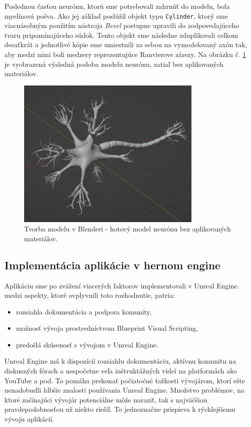 Poslednou časťou neurónu, ktorú sme potrebovali zahrnúť do modelu, bola myelínová pošva. Ako jej základ poslúžil objekt typu \texttt{Cylinder}, ktorý sme viacnásobným použitím nástroja \emph{Bevel} postupne
upravili do zodpovedajúceho tvaru pripomínajúceho súdok. Tento objekt sme následne zduplikovali celkom desaťkrát a jednotlivé kópie sme umiestnili za sebou na vymodelovaný axón tak, aby medzi 
nimi boli medzery reprezentujúce Ranvierove zárezy. Na obrázku č. \ref{blender5} je vyobrazená výsledná podoba modelu neurónu, zatiaľ bez aplikovaných materiálov.
 
\begin{figure}[!htbp]
  \centering
  \includegraphics[width=9cm]{img/finalModel-crop.png}
  \caption{Tvorba modelu v Blenderi - hotový model neurónu bez aplikovaných materiálov.}
  \label{blender5}
\end{figure}

\subsection{Implementácia aplikácie v hernom engine}\label{gameengine}
Aplikáciu sme po zvážení viacerých faktorov implementovali v Unreal Engine. medzi aspekty, ktoré ovplyvnili toto rozhodnutie, patria:
\begin{itemize}
  \item rozsiahla dokumentácia a podpora komunity,
  \item možnosť vývoja prostredníctvom Blueprint Visual Scripting,
  \item predošlá skúsenosť s vývojom v Unreal Engine.
\end{itemize}

Unreal Engine má k dispozícií rozsiahlu dokumentáciu, aktívnu komunitu na diskusných fórach a nespočetne veľa inštruktážných videí na platformách ako YouTube a pod. To pomáha prekonať počiatočné
ťažkosti vývojárom, ktorí ešte nenadobudli hlbšie znalosti používania Unreal Engine. Množstvo problémov, na ktoré začínajúci vývojár potenciálne môže naraziť, tak s najväčšiou pravdepodobnosťou
už niekto riešil. To jednoznačne prispieva k rýchlejšiemu vývoju aplikácií.


